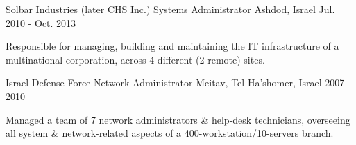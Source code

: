 \begin{cventries}
  \cventry
    {Solbar Industries (later CHS Inc.)}
    {Systems Administrator}
    {Ashdod, Israel}
    {Jul. 2010 - Oct. 2013}
    {
      \begin{cvitems}
        \item {Responsible for managing, building and maintaining the IT infrastructure of a multinational corporation, across 4 different (2 remote) sites.}
      \end{cvitems}
    }

  \cventry
    {Israel Defense Force}
    {Network Administrator}
    {Meitav, Tel Ha'shomer, Israel}
    {2007 - 2010}
    {
      \begin{cvitems}
        \item {Managed a team of 7 network administrators \& help-desk technicians, overseeing all system \& network-related aspects of a 400-workstation/10-servers branch.}
      \end{cvitems}
    }

\end{cventries}


